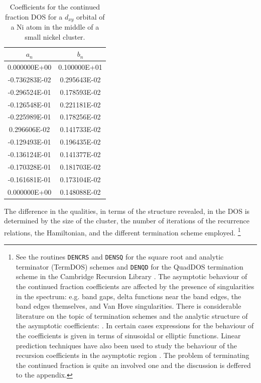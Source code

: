 \begin{table}
\begin{center}
\begin{tabular}{|c|c|}
\hline
$a_{n}$ & $b_{n}$ \\
\hline
 0.000000E+00 & 0.100000E+01\\
-0.736283E-02 & 0.295643E-02\\
-0.296524E-01 & 0.178593E-02\\
-0.126548E-01 & 0.221181E-02\\
-0.225989E-01 & 0.178256E-02\\
 0.296606E-02 & 0.141733E-02\\
-0.129493E-01 & 0.196435E-02\\
-0.136124E-01 & 0.141377E-02\\
-0.170328E-01 & 0.181703E-02\\
-0.161681E-01 & 0.173104E-02\\
 0.000000E+00 & 0.148088E-02\\
\hline
\end{tabular}
\caption{Coefficients for the continued fraction DOS for a $d_{xy}$ orbital of a Ni 
atom in the middle of a small nickel cluster.\label{tab:reccoeffs}}
\end{center}
\end{table}

The difference in the qualities, in terms of the structure revealed, in the DOS 
is determined by the size of the cluster, the number of iterations of the
recurrence relations, the Hamiltonian, and the different termination 
scheme employed. 
\footnote{See the routines \texttt{DENCRS} and \texttt{DENSQ} 
for the square root and analytic terminator (TermDOS) schemes and \texttt{DENQD} 
for the QuadDOS termination scheme in the Cambridge Recursion Library 
\cite{nex84,haydock84,haydock85}.
The asymptotic behaviour of the continued fraction coefficients 
are affected by the presence of singularities
in the spectrum: e.g. band gaps, delta functions near the band edges,
the band edges themselves, and Van Hove singularities.
There is considerable literature on the topic of termination schemes 
and the analytic structure of the asymptotic coefficients:
\cite{hodges77,bylander80,turchi82,haydock84,luchini87,glanville88,
yoshino87,yoshino88,haydock89,haydock10,alhaidari18}.
In certain cases expressions for the behaviour of the coefficients
is given in terms of sinusoidal or elliptic functions. Linear prediction techniques
have also been used to study the behaviour of the recursion coefficients in the
asymptotic region \cite{allan84}. The problem of terminating the continued fraction
is quite an involved one and the discussion is deffered to the appendix.}

